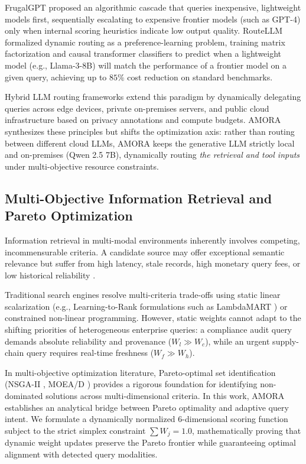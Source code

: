 FrugalGPT \cite{chen2023frugalgpt} proposed an algorithmic cascade that queries inexpensive, lightweight models first, sequentially escalating to expensive frontier models (such as GPT-4) only when internal scoring heuristics indicate low output quality. RouteLLM \cite{ong2024routellm} formalized dynamic routing as a preference-learning problem, training matrix factorization and causal transformer classifiers to predict when a lightweight model (e.g., Llama-3-8B) will match the performance of a frontier model on a given query, achieving up to $85\%$ cost reduction on standard benchmarks.

Hybrid LLM routing frameworks \cite{ding2024hybrid} extend this paradigm by dynamically delegating queries across edge devices, private on-premises servers, and public cloud infrastructure based on privacy annotations and compute budgets. AMORA synthesizes these principles but shifts the optimization axis: rather than routing between different cloud LLMs, AMORA keeps the generative LLM strictly local and on-premises (Qwen 2.5 7B), dynamically routing \textit{the retrieval and tool inputs} under multi-objective resource constraints.

\subsection{Multi-Objective Information Retrieval and Pareto Optimization}
Information retrieval in multi-modal environments inherently involves competing, incommensurable criteria. A candidate source may offer exceptional semantic relevance but suffer from high latency, stale records, high monetary query fees, or low historical reliability \cite{miettinen1999multiobjective,deb2001multi}.

Traditional search engines resolve multi-criteria trade-offs using static linear scalarization (e.g., Learning-to-Rank formulations such as LambdaMART \cite{burges2010lambdamart}) or constrained non-linear programming. However, static weights cannot adapt to the shifting priorities of heterogeneous enterprise queries: a compliance audit query demands absolute reliability and provenance ($W_l \gg W_c$), while an urgent supply-chain query requires real-time freshness ($W_f \gg W_h$).

In multi-objective optimization literature, Pareto-optimal set identification (NSGA-II \cite{deb2002fast}, MOEA/D \cite{zhang2007moea}) provides a rigorous foundation for identifying non-dominated solutions across multi-dimensional criteria. In this work, AMORA establishes an analytical bridge between Pareto optimality and adaptive query intent. We formulate a dynamically normalized 6-dimensional scoring function subject to the strict simplex constraint $\sum W_j = 1.0$, mathematically proving that dynamic weight updates preserve the Pareto frontier while guaranteeing optimal alignment with detected query modalities.

